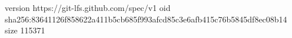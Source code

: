 version https://git-lfs.github.com/spec/v1
oid sha256:83641126f858622a411b5cb685f993afcd85c3e6afb415c76b5845df8ec08b14
size 115371
